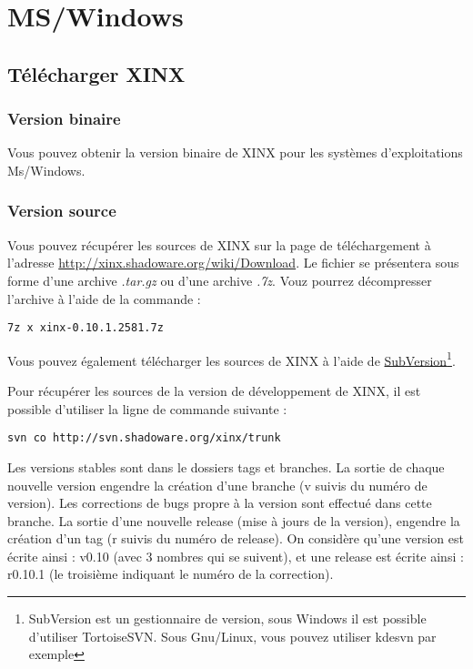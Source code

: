 \documentclass[a4paper,10pt,twoside,titlepage,onecolumn]{book}
\begin{document}
\section{MS/Windows}

\subsection{Télécharger XINX}

\subsubsection{Version binaire}

Vous pouvez obtenir la version binaire de XINX pour les systèmes d'exploitations Ms/Windows.

\subsubsection{Version source}

Vous pouvez récupérer les sources de XINX sur la page de téléchargement à l'adresse \url{http://xinx.shadoware.org/wiki/Download}. Le fichier se présentera sous forme d'une archive \emph{.tar.gz} ou d'une archive \emph{.7z}. Vouz pourrez décompresser l'archive à l'aide de la commande :

\begin{verbatim}
7z x xinx-0.10.1.2581.7z
\end{verbatim}

Vous pouvez également télécharger les sources de XINX à l'aide de \href{http://subversion.tigris.org/}{SubVersion}\footnote{SubVersion est un gestionnaire de version, sous Windows il est possible d'utiliser TortoiseSVN. Sous Gnu/Linux, vous pouvez utiliser kdesvn par exemple}.

Pour récupérer les sources de la version de développement de XINX, il est possible d'utiliser la ligne de commande suivante :

\begin{verbatim} 
svn co http://svn.shadoware.org/xinx/trunk
\end{verbatim}

Les versions stables sont dans le dossiers tags et branches. La sortie de chaque nouvelle version engendre la création d'une branche (v suivis du numéro de version). Les corrections de bugs propre à la version sont effectué dans cette branche. La sortie d'une nouvelle release (mise à jours de la version), engendre la création d'un tag (r suivis du numéro de release). On considère qu'une version est écrite ainsi : v0.10 (avec 3 nombres qui se suivent), et une release est écrite ainsi : r0.10.1 (le troisième indiquant le numéro de la correction).
\end{document}
